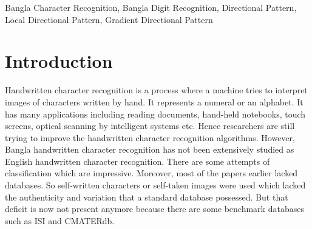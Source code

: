 \documentclass[conference]{IEEEtran}
\begin{document}
\begin{IEEEkeywords}
Bangla Character Recognition, Bangla Digit Recognition, Directional Pattern, Local Directional Pattern, Gradient Directional Pattern
\end{IEEEkeywords}

\IEEEpeerreviewmaketitle


\section{Introduction}
Handwritten character recognition is a process where a machine tries to interpret images of characters written by hand. It represents a numeral or an alphabet. It has many applications including reading documents, hand-held notebooks, touch screens, optical scanning by intelligent systems etc. Hence researchers are still trying to improve the handwritten character recognition algorithms. However, Bangla handwritten character recognition has not been extensively studied as English handwritten character recognition. There are some attempts of classification which are impressive. Moreover, most of the papers earlier lacked databases. So self-written characters or self-taken images were used which lacked the authenticity and variation that a standard database possessed. But that deficit is now not present anymore because there are some benchmark databases such as ISI \cite{2006isi} and CMATERdb\cite{2009cmater}.
\end{document}
